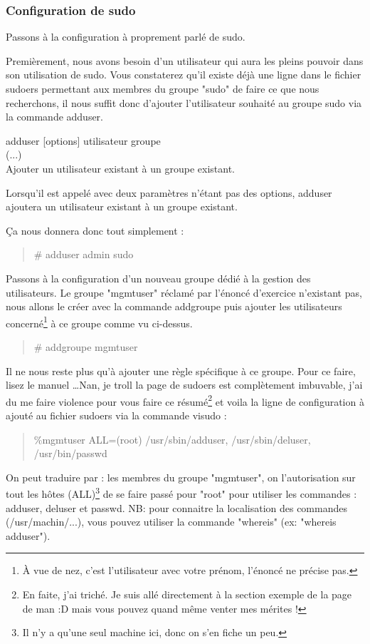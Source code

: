 \documentclass[a4paper]{article}
\newcommand{\commande}[1] {
    \begin{quote}
    \tt\raggedright #1 
    \end{quote}
}
\newcommand{\man}[2]{
    \begin{tcolorbox}[toprule=3mm,width=\textwidth,outer arc=0mm,colbacktitle=grayman,coltitle=black,colback={grayman},colframe={grayman},title={man : \tt #1}]
        \tt\raggedright #2
    \end{tcolorbox}
}
\newcommand{\mandesc}[1]{
    \begin{adjustwidth}{0.8cm}{}
        #1
    \end{adjustwidth}
}
\begin{document}
\subsubsection{Configuration de sudo}
\par Passons à la configuration à proprement parlé de sudo.
\par Premièrement, nous avons besoin d'un utilisateur qui aura les pleins pouvoir dans son utilisation de sudo. Vous constaterez qu'il existe déjà une ligne dans le fichier sudoers permettant aux membres du groupe "sudo" de faire ce que nous recherchons, il nous suffit donc d'ajouter l'utilisateur souhaité au groupe sudo via la commande adduser.
\man{adduser}{adduser [options] utilisateur groupe\\
(...)\\
Ajouter un utilisateur existant à un groupe existant.
\mandesc{Lorsqu'il est appelé avec deux paramètres n'étant pas des options, adduser ajoutera un utilisateur existant à un groupe existant.}}
\par Ça nous donnera donc tout simplement :
\commande{\# adduser admin sudo}
\par Passons à la configuration d'un nouveau groupe dédié à la gestion des utilisateurs. Le groupe "mgmtuser" réclamé par l'énoncé d'exercice n'existant pas, nous allons le créer avec la commande addgroupe puis ajouter les utilisateurs concerné\footnote{À vue de nez, c'est l'utilisateur avec votre prénom, l'énoncé ne précise pas.} à ce groupe comme vu ci-dessus.
\commande{\# addgroupe mgmtuser}
\par Il ne nous reste plus qu'à ajouter une règle spécifique à ce groupe. Pour ce faire, lisez le manuel \dots Nan, je troll la page de sudoers est complètement imbuvable, j'ai du me faire violence pour vous faire ce résumé\footnote{En faite, j'ai triché. Je suis allé directement à la section exemple de la page de man :D mais vous pouvez quand même venter mes mérites !} et voila la ligne de configuration à ajouté au fichier sudoers via la commande visudo :
\commande{\%mgmtuser ALL=(root) /usr/sbin/adduser, /usr/sbin/deluser, /usr/bin/passwd}
\par On peut traduire par : les membres du groupe "mgmtuser", on l'autorisation sur tout les hôtes (ALL)\footnote{Il n'y a qu'une seul machine ici, donc on s'en fiche un peu.} de se faire passé pour "root" pour utiliser les commandes : adduser, deluser et passwd. NB: pour connaitre la localisation des commandes (/usr/machin/...), vous pouvez utiliser la commande "whereis" (ex: "whereis adduser").
\end{document}
